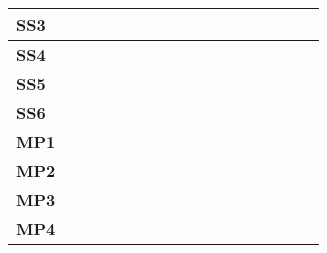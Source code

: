\documentclass[12pt]{article}
\begin{document}
\begin{table}[H]
\begin{adjustwidth}{-0.1in}{-1in}
{\begin{tabular}{c|c|c|c|c|c|c|c|c|c|c|c|c|c|c|c|c|}
\multicolumn{1}{|l|}{\textbf{SS3}}   &              &              &              &              &              &              &              &              &              &              &              &              &              &              &             &              \\ \hline
\multicolumn{1}{|l|}{\textbf{SS4}}   &              &              &              &              &              &              &              &              &              &              &              &              &              &              &             &              \\ \hline
\multicolumn{1}{|l|}{\textbf{SS5}}   &              &              &              &              &              &              &              &              &              &              &              &              &              &              &             &              \\ \hline
\multicolumn{1}{|l|}{\textbf{SS6}}   &              &              &              &              &              &              &              &              &              &              &              &              &              &              &             &              \\ \hline
\multicolumn{1}{|l|}{\textbf{MP1}}   &              &              &              &              &              &              &              &              &              &              &              &              &              &              &             &              \\ \hline
\multicolumn{1}{|l|}{\textbf{MP2}}   &              &              &              &              &              &              &              &              &              &              &              &              &              &              &             &              \\ \hline
\multicolumn{1}{|l|}{\textbf{MP3}}   &              &              &              &              &              &              &              &              &              &              &              &              &              &              &             &              \\ \hline
\multicolumn{1}{|l|}{\textbf{MP4}}   &              &              &              &              &              &              &              &              &              &              &              &              &              &              &             &              \\ \hline

\end{tabular}}
\end{adjustwidth}
\end{table}
\end{document}
